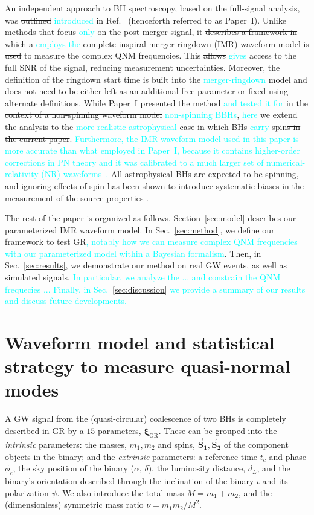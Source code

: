 \documentclass[twocolumn,prd,aps,superscriptaddress,preprintnumbers,tightenlines,showpacs,nofootinbib,eqsecnum,amsfonts,amsmath]{revtex4-1}
\newcommand{\paperone}{Paper~I\xspace}
\newcommand{\ab}[1]{\textcolor{cyan}{#1}}
\newcommand{\bxigr}{\bm{\xi}_{\text{GR}}}
\newcommand{\bs}[1]{\bm{\vec{S}_{#1}}}
\begin{document}
An independent approach to BH spectroscopy, based on the full-signal
analysis, was \sout{outlined} \ab{introduced} in Ref.~\citep{Brito:2018rfr} 
(henceforth referred to as \paperone). Unlike methods that focus \ab{only} 
on the post-merger signal, it \sout{describes a framework in which a} 
\ab{employs the} complete inspiral-merger-ringdown
(IMR) waveform \sout{model is used} to measure the complex QNM
frequencies. This \sout{allows} \ab{gives} access to the full SNR of the signal,
reducing measurement uncertainties. Moreover, the definition of the
ringdown start time is built into the \ab{merger-ringdown} model and does not need to be
either left as an additional free parameter or fixed using alternate
definitions. While \paperone presented the method \ab{and tested it for }\sout{in the context of a
non-spinning waveform model} \ab{non-spinning BBHs}, \ab{here} we extend the analysis to the \ab{more 
realistic astrophysical} case in which BHs \ab{carry} spin\sout{s in the current paper}. \ab{Furthermore, 
the IMR waveform model used in this paper is more accurate than what employed in \paperone, 
because it contains higher-order corrections in PN theory and it was calibrated to a much larger set 
of numerical-relativity (NR) waveforms~\cite{Bohe:2016gbl}.}  All astrophysical BHs are expected to be spinning, 
and ignoring effects of spin has been shown to introduce systematic biases in the measurement of the 
source properties \cite{paper_showing_systematics_from_ignoring_spin}.

The rest of the paper is organized as follows. Section~\ref{sec:model} describes our parameterized IMR
waveform model. In Sec.~\ref{sec:method}, we define our framework to test GR\ab{, notably how we can measure 
complex QNM frequencies with our parameterized model within a Bayesian formalism}. Then, in Sec.~\ref{sec:results}, 
we demonstrate our method on real GW events, as well as simulated signals. \ab{In particular, we analyze 
the ... and constrain the QNM frequecies ... Finally, in Sec.~\ref{sec:discussion} we provide a summary of
our results and discuss future developments.} 

\section{Waveform model and statistical strategy to measure quasi-normal modes}

A GW signal from the (quasi-circular) coalescence of two BHs is
completely described in GR by a $15$ parameters,
$\bxigr$. These can be grouped into the \emph{intrinsic} parameters:
the masses, $m_1, m_2$ and spins, $\bs1, \bs2$ of the component 
objects in the binary; and the 
\emph{extrinsic} parameters: a reference time $t_c$ and phase 
$\phi_c$, the sky position of the binary ($\alpha$,
$\delta$), the luminosity distance, $d_L$, and the binary's orientation
described through the inclination of the binary $\iota$ and its
polarization $\psi$. We also introduce the total mass $M = m_1+m_2$, 
and the (dimensionless) symmetric mass ratio $\nu = m_1m_2/M^2$. 
\end{document}
